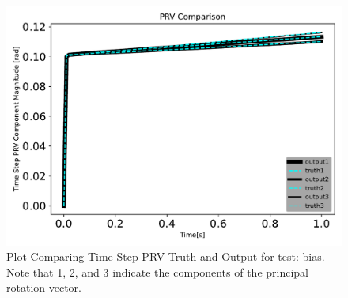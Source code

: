 \begin{figure}[htbp]\centerline{\includegraphics[height=0.7\textwidth, keepaspectratio]{AutoTeX/biasPRVcomparison}}\caption{Plot Comparing Time Step PRV Truth and Output for test: bias. Note that 1, 2, and 3 indicate the components of the principal rotation vector.}\label{fig:biasPRVcomparison}\end{figure}
